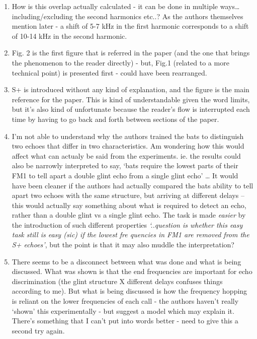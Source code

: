 \documentclass[
]{book}
\providecommand{\tightlist}{%
  \setlength{\itemsep}{0pt}\setlength{\parskip}{0pt}}
\begin{document}
\begin{enumerate}
\def\labelenumi{\arabic{enumi}.}
\tightlist
\item
  How is this overlap actually calculated - it can be done in multiple ways\ldots including/excluding the second harmonics etc..? As the authors themselves mention later - a shift of 5-7 kHz in the first harmonic corresponds to a shift of 10-14 kHz in the second harmonic.
\item
  Fig. 2 is the first figure that is referred in the paper (and the one that brings the phenomenon to the reader directly) - but, Fig.1 (related to a more technical point) is presented first - could have been rearranged.
\item
  S+ is introduced without any kind of explanation, and the figure is the main reference for the paper. This is kind of understandable given the word limits, but it's also kind of unfortunate because the reader's flow is interrupted each time by having to go back and forth between sections of the paper.
\item
  I'm not able to understand why the authors trained the bats to distinguish two echoes that differ in two characteristics. Am wondering how this would affect what can actualy be said from the experiments. ie. the results could also be narrowly interpreted to say, `bats require the lowest parts of their FM1 to tell apart a double glint echo from a single glint echo' \ldots{} It would have been cleaner if the authors had actually compared the bats ability to tell apart two echoes with the same structure, but arriving at different delays -- this would actually say something about what is required to detect an echo, rather than a double glint vs a single glint echo. The task is made \emph{easier} by the introduction of such different properties \emph{`..question is whether this easy task still is easy (sic) if the lowest fre quencies in FM1 are removed from the S+ echoes'}, but the point is that it may also muddle the interpretation?
\item
  There seems to be a disconnect between what was done and what is being discussed. What was shown is that the end frequencies are important for echo discrimination (the glint structure X different delays confuses things according to me). But what is being discussed is how the frequency hopping is reliant on the lower frequencies of each call - the authors haven't really `shown' this experimentally - but suggest a model which may explain it. There's something that I can't put into words better - need to give this a second try again.
\end{enumerate}
\end{document}
